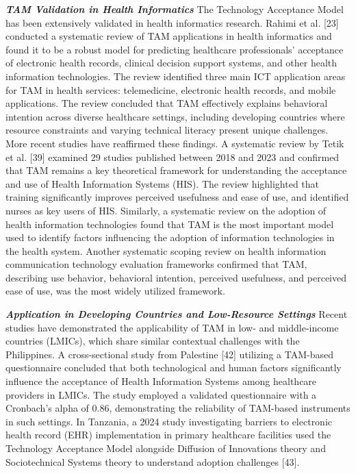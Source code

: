 \documentclass[12pt, a4paper]{report}
\begin{document}
\noindent \textbf{\textit{TAM Validation in Health Informatics}}
The Technology Acceptance Model has been extensively validated in health informatics research. Rahimi et al. [23] conducted a systematic review of TAM applications in health informatics and found it to be a robust model for predicting healthcare professionals' acceptance of electronic health records, clinical decision support systems, and other health information technologies. The review identified three main ICT application areas for TAM in health services: telemedicine, electronic health records, and mobile applications. The review concluded that TAM effectively explains behavioral intention across diverse healthcare settings, including developing countries where resource constraints and varying technical literacy present unique challenges.
More recent studies have reaffirmed these findings. A systematic review by Tetik et al. [39] examined 29 studies published between 2018 and 2023 and confirmed that TAM remains a key theoretical framework for understanding the acceptance and use of Health Information Systems (HIS). The review highlighted that training significantly improves perceived usefulness and ease of use, and identified nurses as key users of HIS.
Similarly, a systematic review on the adoption of health information technologies found that TAM is the most important model used to identify factors influencing the adoption of information technologies in the health system. Another systematic scoping review on health information communication technology evaluation frameworks confirmed that TAM, describing use behavior, behavioral intention, perceived usefulness, and perceived ease of use, was the most widely utilized framework.

\noindent \textbf{\textit{Application in Developing Countries and Low-Resource Settings}}
Recent studies have demonstrated the applicability of TAM in low- and middle-income countries (LMICs), which share similar contextual challenges with the Philippines. A cross-sectional study from Palestine [42] utilizing a TAM-based questionnaire concluded that both technological and human factors significantly influence the acceptance of Health Information Systems among healthcare providers in LMICs. The study employed a validated questionnaire with a Cronbach's alpha of 0.86, demonstrating the reliability of TAM-based instruments in such settings.
In Tanzania, a 2024 study investigating barriers to electronic health record (EHR) implementation in primary healthcare facilities used the Technology Acceptance Model alongside Diffusion of Innovations theory and Sociotechnical Systems theory to understand adoption challenges [43].
\end{document}
